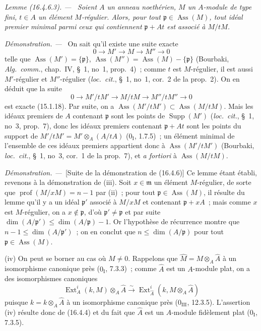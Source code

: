 \documentclass[10pt,oneside]{book}
\makeatletter
\newcommand{\setmanualcurrentlabel}[1]{\def\@currentlabel{#1}}
\newenvironment{lemma}[1][]{%
  \setmanualcurrentlabel{#1}\par\medskip\noindent\itshape Lemme (#1). ---\ }{\par}
\newenvironment{proof}{%
  \par\medskip\noindent\textit{Démonstration. ---\ }}{\par}
\makeatother
\begin{document}
\begin{lemma}[16.4.6.3]
\label{0.16.4.6.3-fr}
Soient $A$ un anneau noethérien, $M$ un $A$-module de type fini, $t\in A$ un
élément $M$-régulier. Alors, pour tout
$\mathfrak{p}\in\operatorname{Ass}(M)$, tout idéal premier minimal parmi ceux
qui contiennent $\mathfrak{p}+At$ est associé à $M/tM$.
\end{lemma}

\begin{proof}
On sait qu'il existe une suite exacte
\[
  0\to M'\to M\to M''\to0
\]
telle que $\operatorname{Ass}(M')=\{\mathfrak{p}\}$,
$\operatorname{Ass}(M'')=\operatorname{Ass}(M)-\{\mathfrak{p}\}$ (Bourbaki,
\emph{Alg.~comm.}, chap.~IV, \S~1, no~1, prop.~4)~; comme $t$ est
$M$-régulier, il est aussi $M'$-régulier et $M''$-régulier
(\emph{loc.~cit.}, \S~1, no~1, cor.~2 de la prop.~2). On en déduit que la
suite
\[
  0\to M'/tM'\to M/tM\to M''/tM''\to0
\]
est exacte (15.1.18). Par suite, on a
$\operatorname{Ass}(M'/tM')\subset\operatorname{Ass}(M/tM)$. Mais les idéaux
premiers de $A$ contenant $\mathfrak{p}$ sont les points de
$\operatorname{Supp}(M')$ (\emph{loc.~cit.}, \S~1, no~3, prop.~7), donc les
idéaux premiers contenant $\mathfrak{p}+At$ sont les points du support de
$M'/tM'=M'\otimes_A(A/tA)$ ($0_{\mathrm I}$, 1.7.5)~; un élément minimal de
l'ensemble de ces idéaux premiers appartient donc à
$\operatorname{Ass}(M'/tM')$ (Bourbaki, \emph{loc.~cit.}, \S~1, no~3,
cor.~1 de la prop.~7), et \emph{a fortiori} à
$\operatorname{Ass}(M/tM)$.
\end{proof}

\begin{proof}[Suite de la démonstration de (16.4.6)]
Ce lemme étant établi, revenons à la démonstration de (iii). Soit
$x\in\mathfrak{m}$ un élément $M$-régulier, de sorte que
$\operatorname{prof}(M/xM)=n-1$ par (ii)~; pour tout
$\mathfrak{p}\in\operatorname{Ass}(M)$, il résulte du lemme qu'il y a un idéal
$\mathfrak{p}'$ associé à $M/xM$ et contenant $\mathfrak{p}+xA$~; mais comme
$x$ est $M$-régulier, on a $x\notin\mathfrak{p}$, d'où
$\mathfrak{p}'\neq\mathfrak{p}$ et par suite
$\dim(A/\mathfrak{p}')\leq\dim(A/\mathfrak{p})-1$. Or l'hypothèse de
récurrence montre que $n-1\leq\dim(A/\mathfrak{p}')$~; on en conclut que
$n\leq\dim(A/\mathfrak{p})$ pour tout
$\mathfrak{p}\in\operatorname{Ass}(M)$.

(iv) On peut se borner au cas où $M\neq0$. Rappelons que
$\widehat{M}=M\otimes_A\widehat{A}$ à un isomorphisme canonique près
($0_{\mathrm I}$, 7.3.3)~; comme $\widehat{A}$ est un $A$-module plat, on a des
isomorphismes canoniques
\[
  \operatorname{Ext}^i_A(k,M)\otimes_A\widehat{A}
  \xrightarrow{\sim}
  \operatorname{Ext}^i_{\widehat{A}}
  (k,M\otimes_A\widehat{A})
\]
puisque $k=k\otimes_A\widehat{A}$ à un isomorphisme canonique près
($0_{\mathrm{III}}$, 12.3.5). L'assertion (iv) résulte donc de (16.4.4) et du
fait que $\widehat{A}$ est un $A$-module fidèlement plat
($0_{\mathrm I}$, 7.3.5).
\end{proof}
\end{document}
